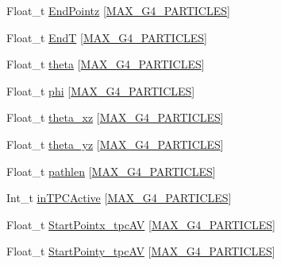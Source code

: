 \begin{DoxyCompactItemize}
\item 
Float\-\_\-t \hyperlink{classanatree_aece0a93def779dff5ea7e1ae40422e4a}{End\-Pointz} \mbox{[}\hyperlink{anatree__core__v09410002__orig_8h_aa5cbba5cc53c011e88805f38503de894}{M\-A\-X\-\_\-\-G4\-\_\-\-P\-A\-R\-T\-I\-C\-L\-E\-S}\mbox{]}
\item 
Float\-\_\-t \hyperlink{classanatree_a16fc332cdbbd1e054c7aee4d2b9561ff}{End\-T} \mbox{[}\hyperlink{anatree__core__v09410002__orig_8h_aa5cbba5cc53c011e88805f38503de894}{M\-A\-X\-\_\-\-G4\-\_\-\-P\-A\-R\-T\-I\-C\-L\-E\-S}\mbox{]}
\item 
Float\-\_\-t \hyperlink{classanatree_a0bcd0407cfdaed107584412c86ffda59}{theta} \mbox{[}\hyperlink{anatree__core__v09410002__orig_8h_aa5cbba5cc53c011e88805f38503de894}{M\-A\-X\-\_\-\-G4\-\_\-\-P\-A\-R\-T\-I\-C\-L\-E\-S}\mbox{]}
\item 
Float\-\_\-t \hyperlink{classanatree_a1d3be537590687fc34b9071711b472f2}{phi} \mbox{[}\hyperlink{anatree__core__v09410002__orig_8h_aa5cbba5cc53c011e88805f38503de894}{M\-A\-X\-\_\-\-G4\-\_\-\-P\-A\-R\-T\-I\-C\-L\-E\-S}\mbox{]}
\item 
Float\-\_\-t \hyperlink{classanatree_af77af6e17993e4b2939e91cf761b853d}{theta\-\_\-xz} \mbox{[}\hyperlink{anatree__core__v09410002__orig_8h_aa5cbba5cc53c011e88805f38503de894}{M\-A\-X\-\_\-\-G4\-\_\-\-P\-A\-R\-T\-I\-C\-L\-E\-S}\mbox{]}
\item 
Float\-\_\-t \hyperlink{classanatree_a16256bc2b5ba915bf7f406987e914460}{theta\-\_\-yz} \mbox{[}\hyperlink{anatree__core__v09410002__orig_8h_aa5cbba5cc53c011e88805f38503de894}{M\-A\-X\-\_\-\-G4\-\_\-\-P\-A\-R\-T\-I\-C\-L\-E\-S}\mbox{]}
\item 
Float\-\_\-t \hyperlink{classanatree_a3de3ddbc0b1344bbf21c461c03a68ba8}{pathlen} \mbox{[}\hyperlink{anatree__core__v09410002__orig_8h_aa5cbba5cc53c011e88805f38503de894}{M\-A\-X\-\_\-\-G4\-\_\-\-P\-A\-R\-T\-I\-C\-L\-E\-S}\mbox{]}
\item 
Int\-\_\-t \hyperlink{classanatree_ac37ca3f82d64c588fd9a26bdd4f3498f}{in\-T\-P\-C\-Active} \mbox{[}\hyperlink{anatree__core__v09410002__orig_8h_aa5cbba5cc53c011e88805f38503de894}{M\-A\-X\-\_\-\-G4\-\_\-\-P\-A\-R\-T\-I\-C\-L\-E\-S}\mbox{]}
\item 
Float\-\_\-t \hyperlink{classanatree_a7c2896c7c9d15800bf2698b993894dfe}{Start\-Pointx\-\_\-tpc\-A\-V} \mbox{[}\hyperlink{anatree__core__v09410002__orig_8h_aa5cbba5cc53c011e88805f38503de894}{M\-A\-X\-\_\-\-G4\-\_\-\-P\-A\-R\-T\-I\-C\-L\-E\-S}\mbox{]}
\item 
Float\-\_\-t \hyperlink{classanatree_aff4cc7905cae8c91dfae706d77fe894f}{Start\-Pointy\-\_\-tpc\-A\-V} \mbox{[}\hyperlink{anatree__core__v09410002__orig_8h_aa5cbba5cc53c011e88805f38503de894}{M\-A\-X\-\_\-\-G4\-\_\-\-P\-A\-R\-T\-I\-C\-L\-E\-S}\mbox{]}

\end{DoxyCompactItemize}
